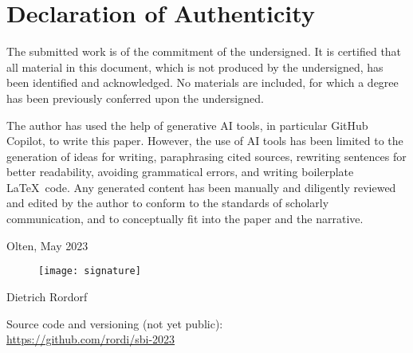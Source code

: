 \vspace*{3cm}

\section*{Declaration of Authenticity}

The submitted work is of the commitment of the undersigned. It is certified that all material
in this document, which is not produced by the undersigned, has been identified and acknowledged.
No materials are included, for which a degree has been previously conferred upon the undersigned.

\vspace*{0.5cm} 

\noindent The author has used the help of generative AI tools, in particular GitHub Copilot, to
write this paper. However, the use of AI tools has been limited to the generation of ideas for
writing, paraphrasing cited sources, rewriting sentences for better readability, avoiding grammatical
errors, and writing boilerplate \LaTeX\ code. Any generated content has been manually and diligently
reviewed and edited by the author to conform to the standards of scholarly communication, and to
conceptually fit into the paper and the narrative.

\vspace*{1cm} 
\noindent Olten, May 2023

\begin{figure}[h!]
    \texttt{[image: signature]}
\end{figure}
\noindent Dietrich Rordorf

\vspace*{2cm} 

\noindent Source code and versioning (not yet public):\\
\url{https://github.com/rordi/sbi-2023} 

